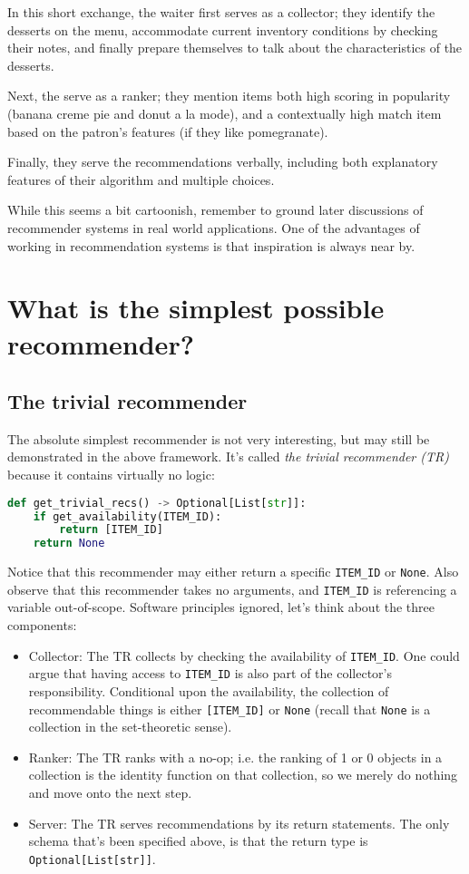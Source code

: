 In this short exchange, the waiter first serves as a collector; they identify the desserts on the menu, accommodate current inventory conditions by checking their notes, and finally prepare themselves to talk about the characteristics of the desserts.

Next, the serve as a ranker; they mention items both high scoring in popularity (banana creme pie and donut a la mode), and a contextually high match item based on the patron's features (if they like pomegranate).

Finally, they serve the recommendations verbally, including both explanatory features of their algorithm and multiple choices. 

While this seems a bit cartoonish, remember to ground later discussions of recommender systems in real world applications. One of the advantages of working in recommendation systems is that inspiration is always near by.

\section{What is the simplest possible recommender?}

\subsection{The trivial recommender}

The absolute simplest recommender is not very interesting, but may still be demonstrated in the above framework. It's called \emph{the trivial recommender (TR)} because it contains virtually no logic:

\begin{lstlisting}[language=Python]
def get_trivial_recs() -> Optional[List[str]]:
    if get_availability(ITEM_ID):
        return [ITEM_ID]
    return None
\end{lstlisting}


Notice that this recommender may either return a specific \lstinline{ITEM_ID} or \lstinline{None}. Also observe that this recommender takes no arguments, and \lstinline{ITEM_ID} is referencing a variable out-of-scope. Software principles ignored, let's think about the three components:
\begin{itemize}
    \item Collector: The TR collects by checking the availability of \lstinline{ITEM_ID}. One could argue that having access to \lstinline{ITEM_ID} is also part of the collector's responsibility. Conditional upon the availability, the collection of recommendable things is either \lstinline{[ITEM_ID]} or \lstinline{None} (recall that \lstinline{None} is a collection in the set-theoretic sense).
    \item Ranker: The TR ranks with a no-op; i.e. the ranking of 1 or 0 objects in a collection is the identity function on that collection, so we merely do nothing and move onto the next step.
    \item Server: The TR serves recommendations by its return statements. The only schema that's been specified above, is that the return type is \lstinline{Optional[List[str]]}. 

\end{itemize}

